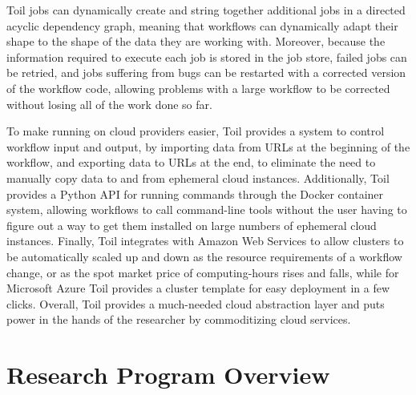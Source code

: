 Toil jobs can dynamically create and string together additional jobs in a directed acyclic dependency graph, meaning that workflows can dynamically adapt their shape to the shape of the data they are working with. Moreover, because the information required to execute each job is stored in the job store, failed jobs can be retried, and jobs suffering from bugs can be restarted with a corrected version of the workflow code, allowing problems with a large workflow to be corrected without losing all of the work done so far.

To make running on cloud providers easier, Toil provides a system to control workflow input and output, by importing data from URLs at the beginning of the workflow, and exporting data to URLs at the end, to eliminate the need to manually copy data to and from ephemeral cloud instances. Additionally, Toil provides a Python API for running commands through the Docker container system, allowing workflows to call command-line tools without the user having to figure out a way to get them installed on large numbers of ephemeral cloud instances. Finally, Toil integrates with Amazon Web Services to allow clusters to be automatically scaled up and down as the resource requirements of a workflow change, or as the spot market price of computing-hours rises and falls, while for Microsoft Azure Toil provides a cluster template for easy deployment in a few clicks. Overall, Toil provides a much-needed cloud abstraction layer and puts power in the hands of the researcher by commoditizing cloud services.

    


\section{Research Program Overview}


